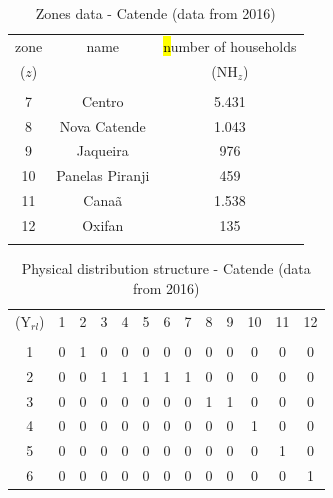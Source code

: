 \documentclass{singlecol}
\theoremstyle{TH}{
\newtheorem{lemma}{Lemma}
\newtheorem{theorem}[lemma]{Theorem}
\newtheorem{corrolary}[lemma]{Corrolary}
\newtheorem{conjecture}[lemma]{Conjecture}
\newtheorem{proposition}[lemma]{Proposition}
\newtheorem{claim}[lemma]{Claim}
\newtheorem{stheorem}[lemma]{Wrong Theorem}
\newtheorem{algorithm}{Algorithm}
}
\theoremstyle{THrm}{
\newtheorem{definition}{Definition}[section]
\newtheorem{question}{Question}[section]
\newtheorem{remark}{Remark}
\newtheorem{scheme}{Scheme}
}
\theoremstyle{THhit}{
\newtheorem{case}{Case}[section]
}
\begin{document}
\begin{table}[H]
\begin{center}
	\begin{tabular}{ c  c  c } 
		zone          & name         & \hl{n}umber of households \\
		($z$)          &              & ($\mathrm{NH}_{z}$)   \\
		                                               \\
		7              & Centro           & 5.431 \\
		8              & Nova Catende     & 1.043 \\
		9              & Jaqueira         &   976 \\
	   10              & Panelas Piranji  &   459 \\
	   11              & Canaã            & 1.538 \\
	   12              & Oxifan           &   135 \\
	   \\
	\end{tabular}
\caption{Zones data - Catende (data from 2016)}
\label{tab:zonesCatende}
\end{center}
\end{table}

\begin{table}[H]
\begin{center}
	\begin{tabular}{ c c c c c c c c c c c c c } 

		($\mathrm{Y}_{rl}$)	& 1 & 2 & 3 & 4 & 5 & 6 & 7 & 8 & 9 & 10 & 11 & 12  \\
		                                                                      \\
		1	              	& 0 & 1 & 0 & 0 & 0 & 0 & 0 & 0 & 0 &  0 &  0 &  0  \\
		2                 	& 0 & 0 & 1 & 1 & 1 & 1 & 1 & 0 & 0 &  0 &  0 &  0  \\
		3                 	& 0 & 0 & 0 & 0 & 0 & 0 & 0 & 1 & 1 &  0 &  0 &  0  \\
		4                 	& 0 & 0 & 0 & 0 & 0 & 0 & 0 & 0 & 0 &  1 &  0 &  0  \\
		5                 	& 0 & 0 & 0 & 0 & 0 & 0 & 0 & 0 & 0 &  0 &  1 &  0  \\
	    6                 	& 0 & 0 & 0 & 0 & 0 & 0 & 0 & 0 & 0 &  0 &  0 &  1  \\
	\end{tabular}
\caption{Physical distribution structure - Catende (data from 2016)}
\label{tab:phyDitStr}
\end{center}
\end{table}
\end{document}

